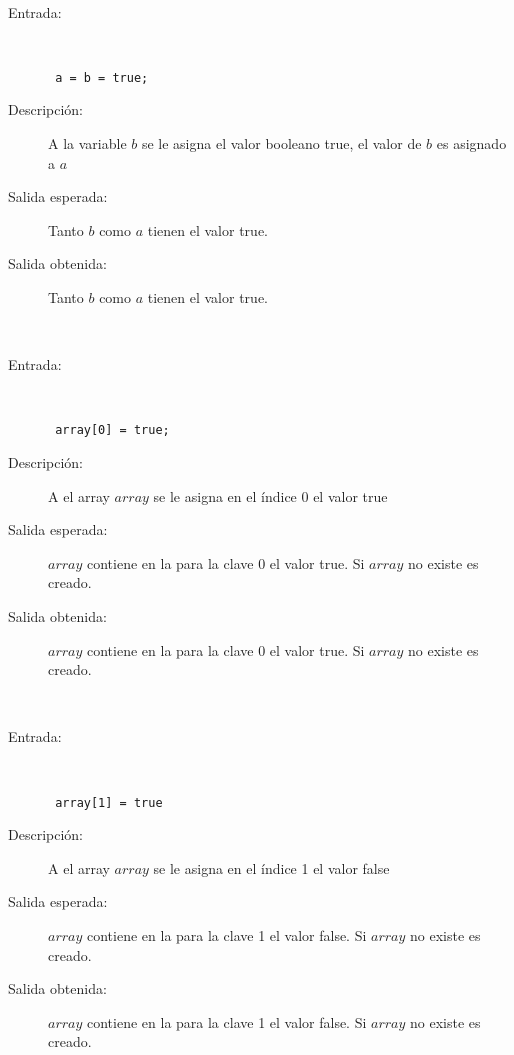 \hfil \\
	\begin{description}
		\item [Entrada:] \hfill \\
\begin{lstlisting}
 a = b = true;
\end{lstlisting}
		\item [Descripción:] A la variable $b$ se le asigna el valor booleano true, el valor de $b$ es asignado a $a$
		\item [Salida esperada:] Tanto $b$ como $a$ tienen el valor true.
		\item [Salida obtenida:] Tanto $b$ como $a$ tienen el valor true.
	\end{description}
\hfil \\
	\begin{description}
		\item [Entrada:] \hfill \\
\begin{lstlisting}
 array[0] = true;
\end{lstlisting}
		\item [Descripción:] A el array $array$ se le asigna en el índice 0 el valor true
		\item [Salida esperada:] $array$ contiene en la para la clave 0 el valor true. Si $array$ no existe es creado.
		\item [Salida obtenida:] $array$ contiene en la para la clave 0 el valor true. Si $array$ no existe es creado.
	\end{description}
\hfil \\
	\begin{description}
		\item [Entrada:] \hfill \\
\begin{lstlisting}
 array[1] = true
\end{lstlisting}
		\item [Descripción:] A el array $array$ se le asigna en el índice 1 el valor false
		\item [Salida esperada:] $array$ contiene en la para la clave 1 el valor false. Si $array$ no existe es creado.
		\item [Salida obtenida:] $array$ contiene en la para la clave 1 el valor false. Si $array$ no existe es creado.
	\end{description}
